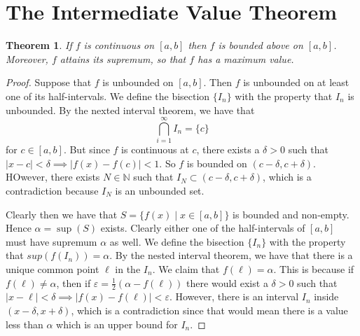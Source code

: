 \documentclass[12pt]{article}
\theoremstyle{definition}
\theoremstyle{plain}
\newtheorem{thm}{Theorem}
\begin{document}
\section{The Intermediate Value Theorem}

\begin{thm}
If $f$ is continuous on $[a, b]$ then $f$ is bounded above on $[a, b]$. Moreover, $f$ attains its supremum, so that $f$ has a maximum value.
\end{thm}

\begin{proof}
Suppose that $f$ is unbounded on $[a, b]$. Then $f$ is unbounded on at least one of its half-intervals. We define the bisection $\{I_n\}$ with the property that $I_n$ is unbounded. By the nexted interval theorem, we have that 
\[\bigcap_{i = 1}^{\infty}I_n = \{c\}\] for $c \in [a, b]$. But since $f$ is continuous at $c$, there exists a $\delta > 0$ such that $|x - c| < \delta \implies |f(x) - f(c)| < 1$. So $f$ is bounded on $(c - \delta, c + \delta)$. HOwever, there exists $N \in \mathbb{N}$ such that $I_N \subset (c - \delta, c + \delta)$, which is a contradiction because $I_N$ is an unbounded set.

Clearly then we have that $S = \{f(x) \mid x \in [a,b]\}$ is bounded and non-empty. Hence $\alpha = \sup(S)$ exists. Clearly either one of the half-intervals of $[a, b]$ must have supremum $\alpha$ as well. We define the bisection $\{I_n\}$ with the property that $sup(f(I_n)) = \alpha$. By the nested interval theorem, we have that there is a unique common point $\ell$ in the $I_n$. We claim that $f(\ell) = \alpha$. This is because if $f(\ell) \neq \alpha$, then if $\varepsilon = \frac{1}{2}(\alpha - f(\ell))$ there would exist a $\delta > 0$ such that $|x - \ell| < \delta \implies |f(x) - f(\ell)| < \varepsilon$. However, there is an interval $I_n$ inside $(x - \delta, x + \delta)$, which is a contradiction since that would mean there is a value less than $\alpha$ which is an upper bound for $I_n$.
\end{proof}
\end{document}

